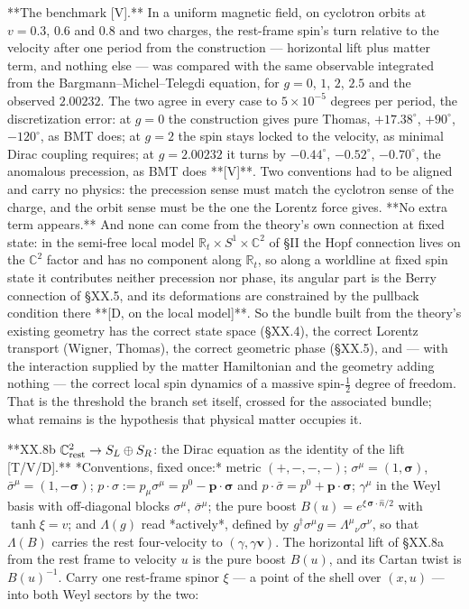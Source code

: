 **The benchmark [V].** In a uniform magnetic field, on cyclotron orbits at $v = 0.3$, $0.6$ and $0.8$ and two charges, the rest-frame spin's turn relative to the velocity after one period from the construction — horizontal lift plus matter term, and nothing else — was compared with the same observable integrated from the Bargmann–Michel–Telegdi equation, for $g = 0$, $1$, $2$, $2.5$ and the observed $2.00232$. The two agree in every case to $5\times10^{-5}$ degrees per period, the discretization error: at $g = 0$ the construction gives pure Thomas, $+17.38^\circ$, $+90^\circ$, $-120^\circ$, as BMT does; at $g = 2$ the spin stays locked to the velocity, as minimal Dirac coupling requires; at $g = 2.00232$ it turns by $-0.44^\circ$, $-0.52^\circ$, $-0.70^\circ$, the anomalous precession, as BMT does **[V]**. Two conventions had to be aligned and carry no physics: the precession sense must match the cyclotron sense of the charge, and the orbit sense must be the one the Lorentz force gives. **No extra term appears.** And none can come from the theory's own connection at fixed state: in the semi-free local model $\mathbb R_t\times S^1\times\mathbb C^2$ of §II the Hopf connection lives on the $\mathbb C^2$ factor and has no component along $\mathbb R_t$, so along a worldline at fixed spin state it contributes neither precession nor phase, its angular part is the Berry connection of §XX.5, and its deformations are constrained by the pullback condition there **[D, on the local model]**. So the bundle built from the theory's existing geometry has the correct state space (§XX.4), the correct Lorentz transport (Wigner, Thomas), the correct geometric phase (§XX.5), and — with the interaction supplied by the matter Hamiltonian and the geometry adding nothing — the correct local spin dynamics of a massive spin-$\tfrac12$ degree of freedom. That is the threshold the branch set itself, crossed for the associated bundle; what remains is the hypothesis that physical matter occupies it.

**XX.8b $\mathbb C^2_{\rm rest}\to S_L\oplus S_R$: the Dirac equation as the identity of the lift [T/V/D].** *Conventions, fixed once:* metric $(+,-,-,-)$; $\sigma^\mu = (1,\boldsymbol\sigma)$, $\bar\sigma^\mu = (1,-\boldsymbol\sigma)$; $p\cdot\sigma := p_\mu\sigma^\mu = p^0-\mathbf p\cdot\boldsymbol\sigma$ and $p\cdot\bar\sigma = p^0+\mathbf p\cdot\boldsymbol\sigma$; $\gamma^\mu$ in the Weyl basis with off-diagonal blocks $\sigma^\mu$, $\bar\sigma^\mu$; the pure boost $B(u) = e^{\xi\,\boldsymbol\sigma\cdot\hat n/2}$ with $\tanh\xi = v$; and $\Lambda(g)$ read *actively*, defined by $g^\dagger\sigma^\mu g = \Lambda^\mu{}_\nu\sigma^\nu$, so that $\Lambda(B)$ carries the rest four-velocity to $(\gamma,\gamma\mathbf v)$. The horizontal lift of §XX.8a from the rest frame to velocity $u$ is the pure boost $B(u)$, and its Cartan twist is $B(u)^{-1}$. Carry one rest-frame spinor $\xi$ — a point of the shell over $(x,u)$ — into both Weyl sectors by the two:

